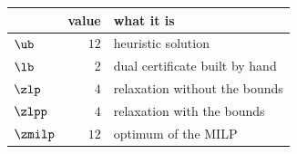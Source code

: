 \begin{center}\small
\begin{tabular}{lrl}
\toprule
 & value & what it is \\
\midrule
$\ub$ & $12$ & heuristic solution \\
$\lb$ & $2$ & dual certificate built by hand \\
$\zlp$ & $4$ & relaxation without the bounds \\
$\zlpp$ & $4$ & relaxation with the bounds \\
$\zmilp$ & $12$ & optimum of the MILP \\
\bottomrule
\end{tabular}
\end{center}
